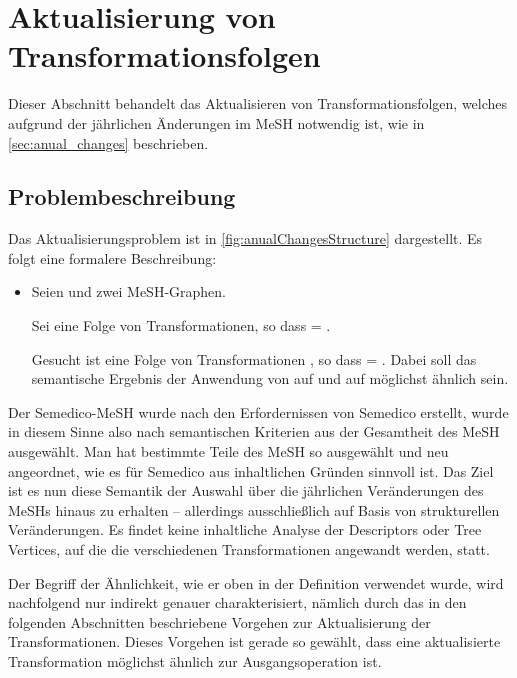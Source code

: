 \section{Aktualisierung von Transformationsfolgen}
\label{sec:merging}
Dieser Abschnitt behandelt das Aktualisieren von Transformationsfolgen, welches aufgrund der jährlichen Änderungen im MeSH notwendig ist, wie in \ref{sec:anual_changes}  beschrieben.

\subsection{Problembeschreibung}
Das Aktualisierungsproblem ist in \autoref{fig:anualChangesStructure} dargestellt. Es folgt eine formalere Beschreibung:

\begin{itemize}
\item[]Seien  und  zwei MeSH-Graphen.\par

Sei  eine Folge von Transformationen, so dass  = .\par

Gesucht ist eine Folge von Transformationen , so dass  = . Dabei soll das semantische Ergebnis der Anwendung von  auf  und  auf  möglichst ähnlich sein.\par  
\end{itemize}

Der Semedico-MeSH wurde nach den Erfordernissen von Semedico erstellt, wurde in diesem Sinne also nach semantischen Kriterien aus der Gesamtheit des MeSH ausgewählt. Man hat bestimmte Teile des MeSH so ausgewählt und neu angeordnet, wie es für Semedico aus inhaltlichen Gründen sinnvoll ist. Das Ziel ist es nun diese Semantik der Auswahl über die jährlichen Veränderungen des MeSHs hinaus zu erhalten -- allerdings ausschließlich auf Basis von strukturellen Veränderungen. Es findet keine inhaltliche Analyse der Descriptors oder Tree Vertices, auf die die verschiedenen Transformationen angewandt werden, statt. \par

Der Begriff der Ähnlichkeit, wie er oben in der Definition verwendet wurde, wird nachfolgend nur indirekt genauer charakterisiert, nämlich durch das in den folgenden Abschnitten beschriebene Vorgehen zur Aktualisierung der Transformationen. Dieses Vorgehen ist gerade so gewählt, dass eine aktualisierte Transformation möglichst ähnlich zur Ausgangsoperation ist.\par

